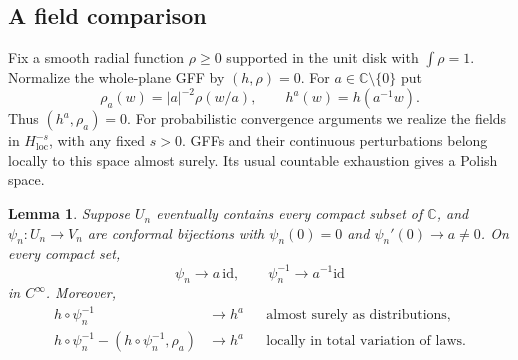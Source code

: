 \documentclass[11pt]{article}
\newtheorem{lemma}[theorem]{Lemma}
\theoremstyle{definition}
\theoremstyle{remark}
\newcommand{\C}{\mathbb C}
\begin{document}
\subsection{A field comparison}
Fix a smooth radial function $\rho\ge0$ supported in the unit disk
with $\int\rho=1$. Normalize the whole-plane GFF by $(h,\rho)=0$.
For $a\in\C\setminus\{0\}$ put
\[
 \rho_a(w)=|a|^{-2}\rho(w/a),\qquad h^a(w)=h(a^{-1}w).
\]
Thus $(h^a,\rho_a)=0$.
For probabilistic convergence arguments we realize the fields in
$H^{-s}_{\mathrm{loc}}$, with any fixed $s>0$. GFFs and their
continuous perturbations belong locally to this space almost
surely. Its usual countable exhaustion gives a Polish space.

\begin{lemma}\label{lem:field}
Suppose $U_n$ eventually contains every compact subset of $\C$,
and $\psi_n:U_n\to V_n$ are conformal bijections with
$\psi_n(0)=0$ and $\psi_n'(0)\to a\ne0$. On every compact set,
\[
 \psi_n\longrightarrow a\,\mathrm{id},\qquad
 \psi_n^{-1}\longrightarrow a^{-1}\mathrm{id}
\]
in $C^\infty$. Moreover,
\begin{align}
 h\circ\psi_n^{-1}&\longrightarrow h^a
             &&\text{almost surely as distributions},\label{eq:field-as}\\
 h\circ\psi_n^{-1}-(h\circ\psi_n^{-1},\rho_a)
       &\longrightarrow h^a
             &&\text{locally in total variation of laws}.
             \label{eq:field-tv}
\end{align}
\end{lemma}
\end{document}
